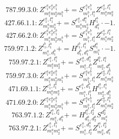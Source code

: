 \documentclass[letterpaper,10pt,fleqn,leqno,onecolumn]{article}
\begin{document}
\begin{equation} \;\;\;\;\;\;  787.99.3.0: Z^{e_{1}^{a}e_{2}^{a}e_{1}^{b}}_{m_{1}^{a}m_{2}^{a}m_{1}^{b}}+=S^{e_{1}^{a}e_{1}^{b}}_{m_{1}^{b},l_{1}^{a}}Z^{e_{2}^{a},l_{1}^{a}}_{m_{1}^{a}m_{2}^{a}} \end{equation}
\begin{equation} \;\;\;\;\;\;  427.66.1.1: Z^{e_{1}^{a},l_{1}^{a}}_{m_{1}^{a}m_{2}^{a}}+=S^{e_{1}^{a},d_{1}^{a}}_{m_{1}^{a}m_{2}^{a}}H^{l_{1}^{a}}_{d_{1}^{a}}\cdot -1. \end{equation}
\begin{equation} \;\;\;\;\;\;  427.66.2.0: Z^{e_{1}^{a}e_{2}^{a}e_{1}^{b}}_{m_{1}^{a}m_{2}^{a}m_{1}^{b}}+=S^{e_{1}^{a}e_{1}^{b}}_{m_{1}^{b},l_{1}^{a}}Z^{e_{2}^{a},l_{1}^{a}}_{m_{1}^{a}m_{2}^{a}} \end{equation}
\begin{equation} \;\;\;\;\;\;  759.97.1.2: Z^{l_{1}^{b},l_{1}^{a}}_{m_{1}^{a},d_{1}^{b}}+=H^{l_{1}^{b},l_{1}^{a}}_{d_{1}^{b},d_{1}^{a}}S^{d_{1}^{a}}_{m_{1}^{a}}\cdot -1. \end{equation}
\begin{equation} \;\;\;\;\;\;  759.97.2.1: Z^{e_{1}^{a},l_{1}^{a}}_{m_{1}^{a}m_{2}^{a}}+=S^{e_{1}^{a},d_{1}^{b}}_{m_{1}^{a},l_{1}^{b}}Z^{l_{1}^{b},l_{1}^{a}}_{m_{2}^{a},d_{1}^{b}} \end{equation}
\begin{equation} \;\;\;\;\;\;  759.97.3.0: Z^{e_{1}^{a}e_{2}^{a}e_{1}^{b}}_{m_{1}^{a}m_{2}^{a}m_{1}^{b}}+=S^{e_{1}^{a}e_{1}^{b}}_{m_{1}^{b},l_{1}^{a}}Z^{e_{2}^{a},l_{1}^{a}}_{m_{1}^{a}m_{2}^{a}} \end{equation}
\begin{equation} \;\;\;\;\;\;  471.69.1.1: Z^{e_{1}^{a},l_{1}^{a}}_{m_{1}^{a}m_{2}^{a}}+=S^{e_{1}^{a},d_{1}^{b}}_{m_{1}^{a},l_{1}^{b}}H^{l_{1}^{b},l_{1}^{a}}_{m_{2}^{a},d_{1}^{b}} \end{equation}
\begin{equation} \;\;\;\;\;\;  471.69.2.0: Z^{e_{1}^{a}e_{2}^{a}e_{1}^{b}}_{m_{1}^{a}m_{2}^{a}m_{1}^{b}}+=S^{e_{1}^{a}e_{1}^{b}}_{m_{1}^{b},l_{1}^{a}}Z^{e_{2}^{a},l_{1}^{a}}_{m_{1}^{a}m_{2}^{a}} \end{equation}
\begin{equation} \;\;\;\;\;\;  763.97.1.2: Z^{l_{1}^{a},l_{2}^{a}}_{m_{1}^{a},d_{1}^{a}}+=H^{l_{1}^{a},l_{2}^{a}}_{d_{1}^{a},d_{2}^{a}}S^{d_{2}^{a}}_{m_{1}^{a}} \end{equation}
\begin{equation} \;\;\;\;\;\;  763.97.2.1: Z^{e_{1}^{a},l_{1}^{a}}_{m_{1}^{a}m_{2}^{a}}+=S^{e_{1}^{a},d_{1}^{a}}_{m_{1}^{a},l_{2}^{a}}Z^{l_{1}^{a},l_{2}^{a}}_{m_{2}^{a},d_{1}^{a}} \end{equation}
\end{document}
